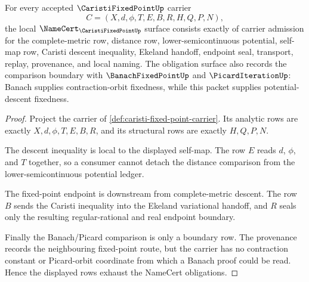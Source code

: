 \begin{theorem}
\label{thm:caristi-fixed-point-namecert-obligations}
For every accepted $\CaristiFixedPointUp$ carrier
$$
C=(X,d,\phi,T,E,B,R,H,Q,P,N),
$$
the local $\NameCert_{\CaristiFixedPointUp}$ surface consists exactly of carrier admission for the complete-metric row, distance row, lower-semicontinuous potential, self-map row, Caristi descent inequality, Ekeland handoff, endpoint seal, transport, replay, provenance, and local naming. The obligation surface also records the comparison boundary with $\BanachFixedPointUp$ and $\PicardIterationUp$: Banach supplies contraction-orbit fixedness, while this packet supplies potential-descent fixedness.
\end{theorem}
\begin{proof}
Project the carrier of \autoref{def:caristi-fixed-point-carrier}. Its analytic rows are exactly $X,d,\phi,T,E,B,R$, and its structural rows are exactly $H,Q,P,N$.

The descent inequality is local to the displayed self-map. The row $E$ reads $d$, $\phi$, and $T$ together, so a consumer cannot detach the distance comparison from the lower-semicontinuous potential ledger.

The fixed-point endpoint is downstream from complete-metric descent. The row $B$ sends the Caristi inequality into the Ekeland variational handoff, and $R$ seals only the resulting regular-rational and real endpoint boundary.

Finally the Banach/Picard comparison is only a boundary row. The provenance records the neighbouring fixed-point route, but the carrier has no contraction constant or Picard-orbit coordinate from which a Banach proof could be read. Hence the displayed rows exhaust the NameCert obligations.
\end{proof}

